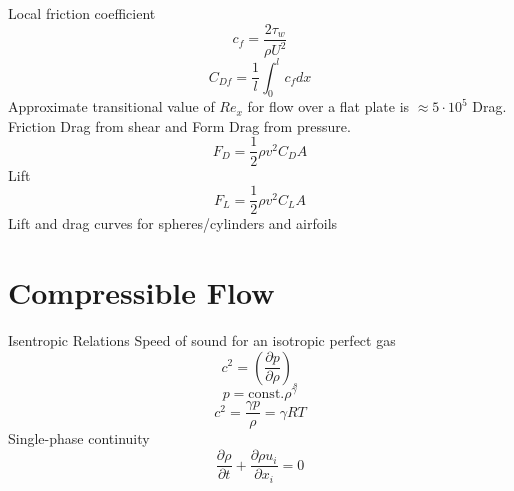 \documentclass{article}
\begin{document}
\newline
\newline
Local friction coefficient
\begin{equation}
  c_f = \frac{2\tau_w}{\rho U^2}
\end{equation}
\begin{equation}
  C_{Df} = \frac{1}{l}\int_0^l c_f dx
\end{equation}
\newline
\newline
Approximate transitional value of $Re_x$ for flow over a flat plate is $\approx 5 \cdot 10^5$
\newline
\newline
Drag. Friction Drag from shear and Form Drag from pressure. 
\begin{equation}
  F_D = \frac{1}{2}\rho v^2 C_D A
\end{equation}
\newline
\newline
Lift
\begin{equation}
  F_L = \frac{1}{2}\rho v^2 C_L A
\end{equation}
\newline
\newline
Lift and drag curves for spheres/cylinders and airfoils


%
%
\newpage
\section{Compressible Flow}

Isentropic Relations
\newline
\newline
Speed of sound for an isotropic perfect gas
\begin{equation}
  c^2 = \left(\frac{\partial p}{\partial \rho}\right)_s
\end{equation}
\begin{equation}
  p = \text{const.} \rho^\gamma
\end{equation}
\begin{equation}
  c^2 = \frac{\gamma p}{\rho} = \gamma R T
\end{equation}
\newline
\newline
Single-phase continuity
\begin{equation}
  \frac{\partial \rho}{\partial t} + \frac{\partial \rho u_i}{\partial x_i} = 0
\end{equation}
\end{document}

